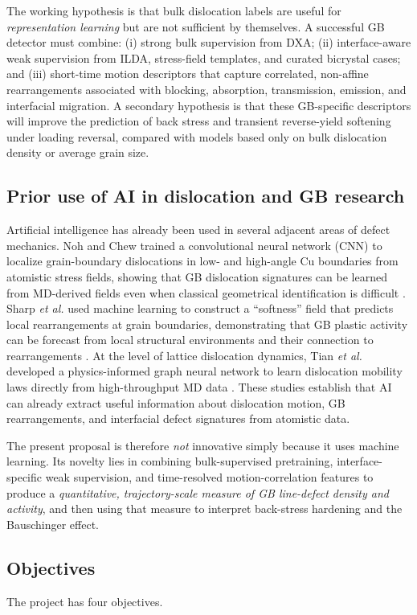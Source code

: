 \documentclass[11pt]{article}
\begin{document}
The working hypothesis is that bulk dislocation labels are useful for \emph{representation learning} but are not sufficient by themselves. A successful GB detector must combine: (i) strong bulk supervision from DXA; (ii) interface-aware weak supervision from ILDA, stress-field templates, and curated bicrystal cases; and (iii) short-time motion descriptors that capture correlated, non-affine rearrangements associated with blocking, absorption, transmission, emission, and interfacial migration. A secondary hypothesis is that these GB-specific descriptors will improve the prediction of back stress and transient reverse-yield softening under loading reversal, compared with models based only on bulk dislocation density or average grain size.

\subsection*{Prior use of AI in dislocation and GB research}
Artificial intelligence has already been used in several adjacent areas of defect mechanics. Noh and Chew trained a convolutional neural network (CNN) to localize grain-boundary dislocations in low- and high-angle Cu boundaries from atomistic stress fields, showing that GB dislocation signatures can be learned from MD-derived fields even when classical geometrical identification is difficult \cite{Noh2024}. Sharp \emph{et al.} used machine learning to construct a ``softness'' field that predicts local rearrangements at grain boundaries, demonstrating that GB plastic activity can be forecast from local structural environments and their connection to rearrangements \cite{Sharp2018}. At the level of lattice dislocation dynamics, Tian \emph{et al.} developed a physics-informed graph neural network to learn dislocation mobility laws directly from high-throughput MD data \cite{Tian2024}. These studies establish that AI can already extract useful information about dislocation motion, GB rearrangements, and interfacial defect signatures from atomistic data.

The present proposal is therefore \emph{not} innovative simply because it uses machine learning. Its novelty lies in combining bulk-supervised pretraining, interface-specific weak supervision, and time-resolved motion-correlation features to produce a \emph{quantitative, trajectory-scale measure of GB line-defect density and activity}, and then using that measure to interpret back-stress hardening and the Bauschinger effect.

\subsection*{Objectives}
The project has four objectives.
\end{document}
